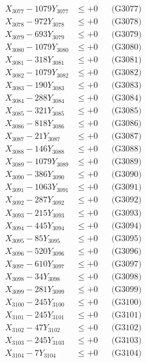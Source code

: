\documentclass[a4paper,10pt]{article}
\begin{document}
{\begin{align}
X_{3077} - 1079Y_{3077} &\leq +0 && \text{(G3077)} \\
X_{3078} - 972Y_{3078} &\leq +0 && \text{(G3078)} \\
X_{3079} - 693Y_{3079} &\leq +0 && \text{(G3079)} \\
X_{3080} - 1079Y_{3080} &\leq +0 && \text{(G3080)} \\
\allowbreak
X_{3081} - 318Y_{3081} &\leq +0 && \text{(G3081)} \\
X_{3082} - 1079Y_{3082} &\leq +0 && \text{(G3082)} \\
X_{3083} - 190Y_{3083} &\leq +0 && \text{(G3083)} \\
X_{3084} - 288Y_{3084} &\leq +0 && \text{(G3084)} \\
X_{3085} - 321Y_{3085} &\leq +0 && \text{(G3085)} \\
X_{3086} - 818Y_{3086} &\leq +0 && \text{(G3086)} \\
X_{3087} - 21Y_{3087} &\leq +0 && \text{(G3087)} \\
X_{3088} - 146Y_{3088} &\leq +0 && \text{(G3088)} \\
X_{3089} - 1079Y_{3089} &\leq +0 && \text{(G3089)} \\
X_{3090} - 386Y_{3090} &\leq +0 && \text{(G3090)} \\
\allowbreak
X_{3091} - 1063Y_{3091} &\leq +0 && \text{(G3091)} \\
X_{3092} - 287Y_{3092} &\leq +0 && \text{(G3092)} \\
X_{3093} - 215Y_{3093} &\leq +0 && \text{(G3093)} \\
X_{3094} - 445Y_{3094} &\leq +0 && \text{(G3094)} \\
X_{3095} - 85Y_{3095} &\leq +0 && \text{(G3095)} \\
X_{3096} - 520Y_{3096} &\leq +0 && \text{(G3096)} \\
X_{3097} - 610Y_{3097} &\leq +0 && \text{(G3097)} \\
X_{3098} - 34Y_{3098} &\leq +0 && \text{(G3098)} \\
X_{3099} - 281Y_{3099} &\leq +0 && \text{(G3099)} \\
X_{3100} - 245Y_{3100} &\leq +0 && \text{(G3100)} \\
\allowbreak
X_{3101} - 245Y_{3101} &\leq +0 && \text{(G3101)} \\
X_{3102} - 47Y_{3102} &\leq +0 && \text{(G3102)} \\
X_{3103} - 245Y_{3103} &\leq +0 && \text{(G3103)} \\
X_{3104} - 7Y_{3104} &\leq +0 && \text{(G3104)} \\

\end{align}}
\end{document}
